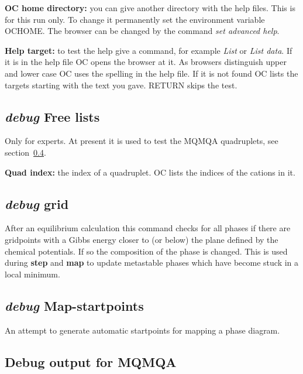 \documentclass[11pt]{article}
\begin{document}
{\bf OC home directory:} you can give another directory with the help
files.  This is for this run only.  To change it permanently set the
environment variable OCHOME.  The browser can be changed by the
command {\em set advanced help}.

{\bf Help target:} to test the help give a command, for example
{\em List} or {\em List data}.
If it is in the help file OC opens the browser at it.  As browsers
distinguish upper and lower case OC uses the spelling in the help file.
If it is not found OC lists the targets starting with the text you
gave.  RETURN skips the test.

\hypertarget{Debug free lists}{}
\subsection{{\em debug} Free lists}

Only for experts.  At present it is used to test the MQMQA
quadruplets, see section~\ref{sc:mqmqa-debug}.

{\bf Quad index:} the index of a quadruplet.  OC lists the indices
of the cations in it.

\hypertarget{Debug grid}{}
\subsection{{\em debug} grid}

After an equilibrium calculation this command checks for all phases if there
are gridpoints with a Gibbs energy closer to (or below) the plane
defined by the chemical potentials.  If so the composition of the
phase is changed.  This is used during {\bf step} and {\bf map} to
update metastable phases which have become stuck in a local minimum.

\hypertarget{Debug map-startpoints}{}
\subsection{{\em debug} Map-startpoints}

An attempt to generate automatic startpoints for mapping a phase diagram.

\hypertarget{Debug MQMQA}{}
\hypertarget{MQMQA debug}{}
\subsection{Debug output for MQMQA}\label{sc:mqmqa-debug}
\end{document}
